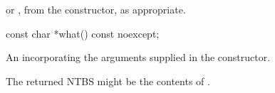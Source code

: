 \begin{itemdescr}
\pnum
\returns {} or , from the constructor,
as appropriate.
\end{itemdescr}

\begin{itemdecl}
const char *what() const noexcept;
\end{itemdecl}

\begin{itemdescr}
\pnum
\returns An \ntbs incorporating the arguments supplied in the constructor.

\enternote The returned NTBS might be the contents of .\exitnote
\end{itemdescr}
